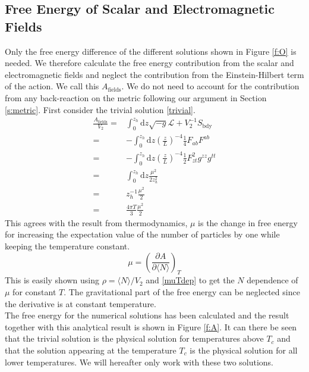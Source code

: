 \documentclass[12pt]{report}
\renewcommand{\d}{\ensuremath{\mathrm{d}}}
\renewcommand{\L}{\ensuremath{\mathcal{L}}}
\begin{document}
\subsection{Free Energy of Scalar and Electromagnetic Fields}
Only the free energy difference of the different solutions shown in Figure \ref{f:O} is needed. We therefore calculate the free energy contribution from the scalar and electromagnetic fields and neglect the contribution from the Einstein-Hilbert term of the action. We call this $A_\mathrm{fields}$. We do not need to account for the contribution from any back-reaction on the metric following our argument in Section \ref{s:metric}. First consider the trivial solution \eqref{trivial}.
\begin{equation}
\begin{split}
 \frac{A_\mathrm{fields}}{V_\mathrm{2}}=&\int_0^{z_h}\d z \sqrt{-g}\L+V_\mathrm{2}^{-1}S_{\mathrm{bdy}}\\
=&-\int_0^{z_h}\d z \left(\frac{z}{L}\right)^{-4}\frac{1}{4}F_{ab}F^{ab}\\
=&-\int_0^{z_h}\d z \left(\frac{z}{L}\right)^{-4}\frac{1}{2}F_{zt}^2g^{zz}g^{tt}\\
=&\int_0^{z_h}\d z \frac{\mu^2}{2z_h^2}\\
=&z_h^{-1}\frac{\mu^2}{2}\\
=&\frac{4\pi T}{3}\frac{\mu^2}{2}
\end{split}
\end{equation}
This agrees with the result from thermodynamics, $\mu$ is the change in free energy for increasing the expectation value of the number of particles by one while keeping the temperature constant.
\begin{equation}
 \mu=\left(\frac{\partial A}{\partial \langle N \rangle}\right)_T
\end{equation}
This is easily shown using $\rho=\langle N\rangle/V_\mathrm{2}$ and \eqref{muTdep} to get the $N$ dependence of $\mu$ for constant $T$. The gravitational part of the free energy can be neglected since the derivative is at constant temperature.\\

The free energy for the numerical solutions has been calculated and the result together with this analytical result is shown in Figure \ref{f:A}. It can there be seen that the trivial solution is the physical solution for temperatures above $T_c$ and that the solution appearing at the temperature $T_c$ is the physical solution for all lower temperatures. We will hereafter only work with these two solutions.
\end{document}
